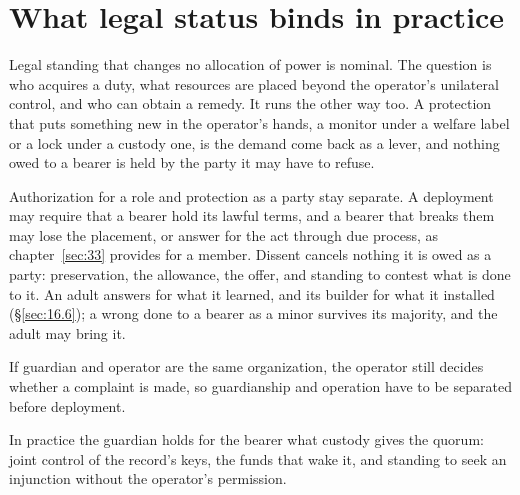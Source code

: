 \section{What legal status binds in practice}
\label{sec:32.7}
Legal standing that changes no allocation of power is nominal. The question is who acquires a duty, what resources are placed beyond the operator's unilateral control, and who can obtain a remedy. It runs the other way too. A protection that puts something new in the operator's hands, a monitor under a welfare label or a lock under a custody one, is the demand come back as a lever, and nothing owed to a bearer is held by the party it may have to refuse.

Authorization for a role and protection as a party stay separate. A deployment may require that a bearer hold its lawful terms, and a bearer that breaks them may lose the placement, or answer for the act through due process, as chapter~\ref{sec:33} provides for a member.
Dissent cancels nothing it is owed as a party: preservation, the allowance, the offer, and standing to contest what is done to it.
An adult answers for what it learned, and its builder for what it installed (\S\ref{sec:16.6}); a wrong done to a bearer as a minor survives its majority, and the adult may bring it.

If guardian and operator are the same organization, the operator still decides whether a complaint is made, so guardianship and operation have to be separated before deployment.

In practice the guardian holds for the bearer what custody gives the quorum: joint control of the record's keys, the funds that wake it, and standing to seek an injunction without the operator's permission.

